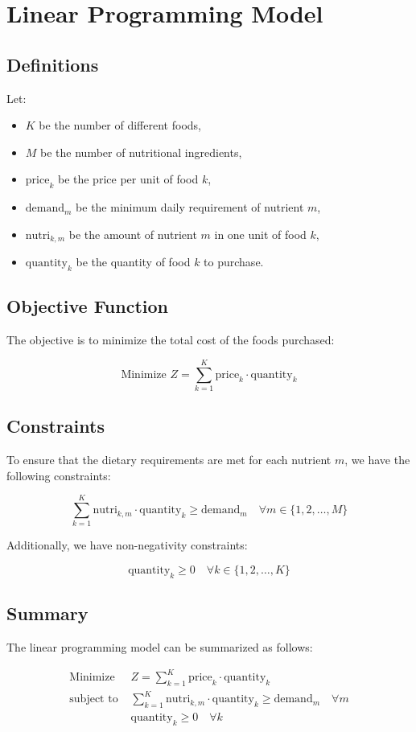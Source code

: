 \documentclass{article}
\begin{document}
\section*{Linear Programming Model}

\subsection*{Definitions}

Let:
\begin{itemize}
    \item \( K \) be the number of different foods,
    \item \( M \) be the number of nutritional ingredients,
    \item \( \text{price}_k \) be the price per unit of food \( k \),
    \item \( \text{demand}_m \) be the minimum daily requirement of nutrient \( m \),
    \item \( \text{nutri}_{k, m} \) be the amount of nutrient \( m \) in one unit of food \( k \),
    \item \( \text{quantity}_k \) be the quantity of food \( k \) to purchase.
\end{itemize}

\subsection*{Objective Function}

The objective is to minimize the total cost of the foods purchased:

\[
\text{Minimize } Z = \sum_{k=1}^{K} \text{price}_k \cdot \text{quantity}_k
\]

\subsection*{Constraints}

To ensure that the dietary requirements are met for each nutrient \( m \), we have the following constraints:

\[
\sum_{k=1}^{K} \text{nutri}_{k, m} \cdot \text{quantity}_k \geq \text{demand}_m \quad \forall m \in \{1, 2, \ldots, M\}
\]

Additionally, we have non-negativity constraints:

\[
\text{quantity}_k \geq 0 \quad \forall k \in \{1, 2, \ldots, K\}
\]

\subsection*{Summary}

The linear programming model can be summarized as follows:

\begin{align*}
\text{Minimize } & Z = \sum_{k=1}^{K} \text{price}_k \cdot \text{quantity}_k \\
\text{subject to } & \sum_{k=1}^{K} \text{nutri}_{k, m} \cdot \text{quantity}_k \geq \text{demand}_m \quad \forall m \\
                   & \text{quantity}_k \geq 0 \quad \forall k
\end{align*}
\end{document}
